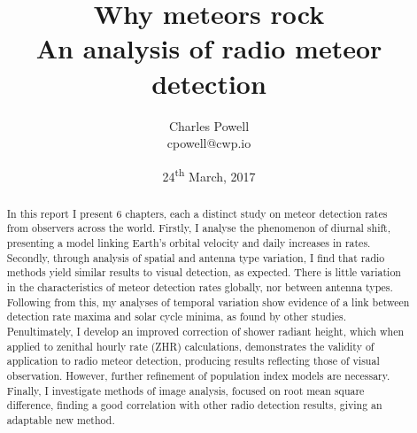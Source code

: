 \documentclass[a4paper,10pt,notitlepage, twocolumn]{report}
\title{\huge Why meteors rock \\ \large An analysis of radio meteor detection}
\author{Charles Powell \\ cpowell@cwp.io}
\begin{document}
	

\begin{titlingpage}
\date{24\textsuperscript{th}\hspace{.05em} March, 2017}
\maketitle

\vspace{10em}
\begin{abstract}
	In this report I present 6 chapters, each a distinct study on meteor detection rates from observers across the world. Firstly, I analyse the phenomenon of diurnal shift, presenting a model linking Earth's orbital velocity and daily increases in rates. Secondly, through analysis of spatial and antenna type variation, I find that radio methods yield similar results to visual detection, as expected. There is little variation in the characteristics of meteor detection rates globally, nor between antenna types. Following from this, my analyses of temporal variation show evidence of a link between detection rate maxima and solar cycle minima, as found by other studies. Penultimately, I develop an improved correction of shower radiant height, which when applied to zenithal hourly rate (ZHR) calculations, demonstrates the validity of application to radio meteor detection, producing results reflecting those of visual observation. However, further refinement of population index models are necessary. Finally, I investigate methods of image analysis, focused on root mean square difference, finding a good correlation with other radio detection results, giving an adaptable new method.
\end{abstract}
\end{titlingpage}

\tableofcontents










\onecolumn
\begin{appendices}

\end{appendices}
\printbibliography
\end{document}
